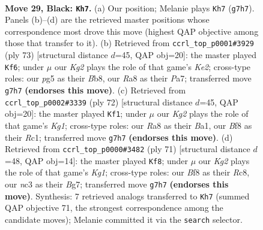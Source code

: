 \documentclass[11pt]{article}
\begin{document}
\clearpage

\begin{figure}[p]\centering
\begin{subfigure}{0.46\textwidth}\centering
\resizebox{\linewidth}{!}{%
\newchessgame
\chessboard[
  setfen={r4b2/p5k1/2N3p1/6P1/P4P2/2N5/1P6/R1B1K3 b Q - 0 29},
  showmover=false,
  pgfstyle=straightmove, color=movearrow, markmove={g7-h7}
]}
\caption{}
\end{subfigure}\hfill
\begin{subfigure}{0.46\textwidth}\centering
\resizebox{\linewidth}{!}{%
\newchessgame
\chessboard[
  setfen={1b6/pp1rk3/6p1/N4p2/8/1P3P1P/P1R2P2/5K2 b - - 1 37},
  showmover=false,
  pgfstyle=straightmove, color=movearrow, markmove={e7-f6}
]}
\caption{}
\end{subfigure}
\\[4pt]
\begin{subfigure}{0.46\textwidth}\centering
\resizebox{\linewidth}{!}{%
\newchessgame
\chessboard[
  setfen={1r4k1/7p/4pp2/3b2p1/8/6P1/pN3P1P/B1R3K1 w - - 0 37},
  showmover=false,
  pgfstyle=straightmove, color=movearrow, markmove={g1-f1}
]}
\caption{}
\end{subfigure}\hfill
\begin{subfigure}{0.46\textwidth}\centering
\resizebox{\linewidth}{!}{%
\newchessgame
\chessboard[
  setfen={2r3k1/r4pb1/7p/1R6/5R1P/3B2P1/2P4K/8 b - - 0 36},
  showmover=false,
  pgfstyle=straightmove, color=movearrow, markmove={g8-f8}
]}
\caption{}
\end{subfigure}
\caption{\textbf{Move 29, Black: \texttt{Kh7}.} (a) Our position; Melanie plays \texttt{Kh7} (\texttt{g7h7}). Panels (b)--(d) are the retrieved master positions whose correspondence most drove this move (highest QAP objective among those that transfer to it). (b) Retrieved from \texttt{ccrl\_top\_p0001\#3929} (ply 73) [structural distance $d$=45, QAP obj=20]: the master played \texttt{Kf6}; under $\mu$ our \emph{Kg2} plays the role of that game's \emph{Ke2}; cross-type roles: our \emph{p}g5 as their \emph{B}b8, our \emph{R}a8 as their \emph{P}a7; transferred move \texttt{g7h7} \textbf{(endorses this move)}. (c) Retrieved from \texttt{ccrl\_top\_p0002\#3339} (ply 72) [structural distance $d$=45, QAP obj=20]: the master played \texttt{Kf1}; under $\mu$ our \emph{Kg2} plays the role of that game's \emph{Kg1}; cross-type roles: our \emph{R}a8 as their \emph{B}a1, our \emph{B}f8 as their \emph{R}c1; transferred move \texttt{g7h7} \textbf{(endorses this move)}. (d) Retrieved from \texttt{ccrl\_top\_p0000\#3482} (ply 71) [structural distance $d$=48, QAP obj=14]: the master played \texttt{Kf8}; under $\mu$ our \emph{Kg2} plays the role of that game's \emph{Kg1}; cross-type roles: our \emph{B}f8 as their \emph{R}c8, our \emph{n}c3 as their \emph{B}g7; transferred move \texttt{g7h7} \textbf{(endorses this move)}. Synthesis: 7 retrieved analogs transferred to \texttt{Kh7} (summed QAP objective 71, the strongest correspondence among the candidate moves); Melanie committed it via the \texttt{search} selector.}
\label{fig:thought-m57}
\end{figure}
\end{document}
